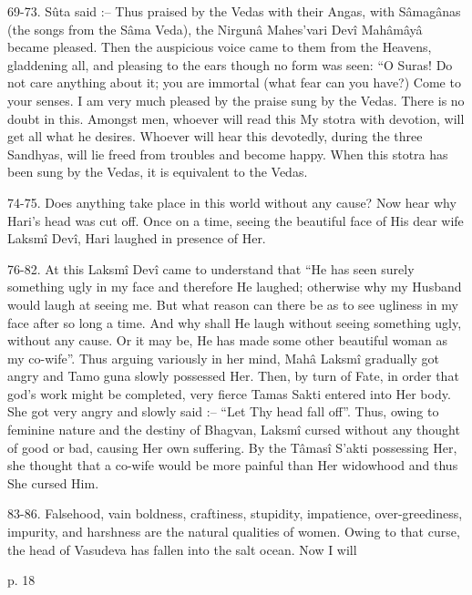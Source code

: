  

69-73. Sûta said :-- Thus praised by the Vedas with their Angas, with Sâmagânas (the songs from the Sâma Veda), the Nirgunâ Mahes'vari Devî Mahâmâyâ became pleased. Then the auspicious voice came to them from the Heavens, gladdening all, and pleasing to the ears though no form was seen: “O Suras! Do not care anything about it; you are immortal (what fear can you have?) Come to your senses. I am very much pleased by the praise sung by the Vedas. There is no doubt in this. Amongst men, whoever will read this My stotra with devotion, will get all what he desires. Whoever will hear this devotedly, during the three Sandhyas, will lie freed from troubles and become happy. When this stotra has been sung by the Vedas, it is equivalent to the Vedas.

 

74-75. Does anything take place in this world without any cause? Now hear why Hari's head was cut off. Once on a time, seeing the beautiful face of His dear wife Laksmî Devî, Hari laughed in presence of Her.

 

76-82. At this Laksmî Devî came to understand that “He has seen surely something ugly in my face and therefore He laughed; otherwise why my Husband would laugh at seeing me. But what reason can there be as to see ugliness in my face after so long a time. And why shall He laugh without seeing something ugly, without any cause. Or it may be, He has made some other beautiful woman as my co-wife”. Thus arguing variously in her mind, Mahâ Laksmî gradually got angry and Tamo guna slowly possessed Her. Then, by turn of Fate, in order that god’s work might be completed, very fierce Tamas Sakti entered into Her body. She got very angry and slowly said :-- “Let Thy head fall off”. Thus, owing to feminine nature and the destiny of Bhagvan, Laksmî cursed without any thought of good or bad, causing Her own suffering. By the Tâmasî S’akti possessing Her, she thought that a co-wife would be more painful than Her widowhood and thus She cursed Him.

 

83-86. Falsehood, vain boldness, craftiness, stupidity, impatience, over-greediness, impurity, and harshness are the natural qualities of women. Owing to that curse, the head of Vasudeva has fallen into the salt ocean. Now I will

 

p. 18

 

